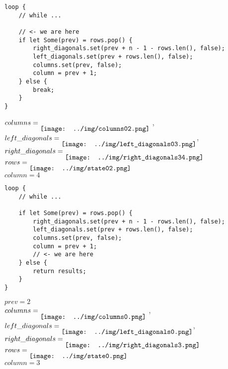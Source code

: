 \begin{frame}[fragile]
    \begin{verbatim}
loop {
    // while ...
    
    // <- we are here
    if let Some(prev) = rows.pop() {
        right_diagonals.set(prev + n - 1 - rows.len(), false);
        left_diagonals.set(prev + rows.len(), false);
        columns.set(prev, false);
        column = prev + 1;
    } else {
        break;
    }
}
    \end{verbatim}
    $columns = \raisebox{-2ex}{\texttt{[image: ../img/columns02.png]}}$ ,
    $left\_diagonals = \raisebox{-2ex}{\texttt{[image: ../img/left\_diagonals03.png]}}$,
    $right\_diagonals = \raisebox{-2ex}{\texttt{[image: ../img/right\_diagonals34.png]}}$ \\
    $rows = \raisebox{-2ex}{\texttt{[image: ../img/state02.png]}}$ \\
    $column = 4$
\end{frame}
\begin{frame}[fragile]
    \begin{verbatim}
loop {
    // while ...
    
    if let Some(prev) = rows.pop() {
        right_diagonals.set(prev + n - 1 - rows.len(), false);
        left_diagonals.set(prev + rows.len(), false);
        columns.set(prev, false);
        column = prev + 1;
        // <- we are here
    } else {
        return results;
    }
}
    \end{verbatim}
    $prev = 2$\\
    $columns = \raisebox{-2ex}{\texttt{[image: ../img/columns0.png]}}$ ,
    $left\_diagonals = \raisebox{-2ex}{\texttt{[image: ../img/left\_diagonals0.png]}}$,
    $right\_diagonals = \raisebox{-2ex}{\texttt{[image: ../img/right\_diagonals3.png]}}$ \\
    $rows = \raisebox{-2ex}{\texttt{[image: ../img/state0.png]}}$ \\
    $column = 3$
\end{frame}
